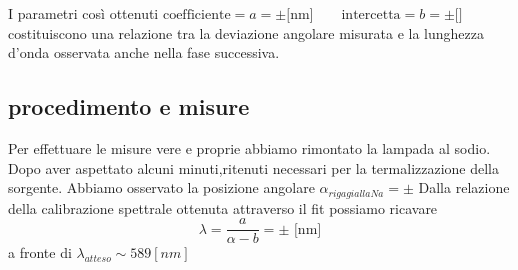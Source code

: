 	I parametri così ottenuti
	\smallskip
	$\text{coefficiente} = a =		\pm		\text{[nm]}
	\qquad \text{intercetta} = b =		\pm		\text{[]}$
	\smallskip
	costituiscono una relazione
	tra la deviazione angolare misurata e la lunghezza d’onda osservata
	anche nella fase
	successiva.
\subsection{procedimento e misure}
	Per effettuare le misure vere e proprie abbiamo 
	rimontato la lampada al sodio.
	Dopo aver aspettato alcuni minuti,ritenuti necessari per la 
	termalizzazione
	della sorgente.
	Abbiamo osservato la posizione angolare $\alpha_{riga gialla Na}=	
	\pm		$
	Dalla relazione della calibrazione spettrale ottenuta attraverso il 
	fit 
	possiamo ricavare 
	\smallskip
	\begin{equation}
		\lambda= \frac{a}{\alpha - b} =		\pm		\text{ [nm]}
	\end{equation}
	a fronte di $ \lambda_{atteso}\sim 589 [nm]$